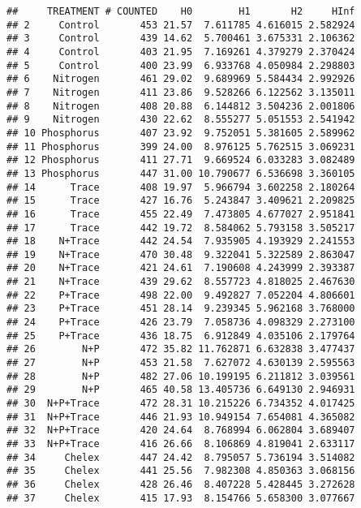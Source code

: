 \documentclass[]{article}
\newenvironment{Shaded}{\begin{snugshade}}{\end{snugshade}}
\newcommand{\KeywordTok}[1]{\textcolor[rgb]{0.13,0.29,0.53}{\textbf{#1}}}
\newcommand{\StringTok}[1]{\textcolor[rgb]{0.31,0.60,0.02}{#1}}
\newcommand{\CommentTok}[1]{\textcolor[rgb]{0.56,0.35,0.01}{\textit{#1}}}
\newcommand{\OperatorTok}[1]{\textcolor[rgb]{0.81,0.36,0.00}{\textbf{#1}}}
\newcommand{\NormalTok}[1]{#1}
\begin{document}
\begin{verbatim}
##     TREATMENT # COUNTED    H0        H1       H2     HInf
## 2     Control       453 21.57  7.611785 4.616015 2.582924
## 3     Control       439 14.62  5.700461 3.675331 2.106362
## 4     Control       403 21.95  7.169261 4.379279 2.370424
## 5     Control       400 23.99  6.933768 4.050984 2.298803
## 6    Nitrogen       461 29.02  9.689969 5.584434 2.992926
## 7    Nitrogen       411 23.86  9.528266 6.122562 3.135011
## 8    Nitrogen       408 20.88  6.144812 3.504236 2.001806
## 9    Nitrogen       430 22.62  8.555277 5.051553 2.541942
## 10 Phosphorus       407 23.92  9.752051 5.381605 2.589962
## 11 Phosphorus       399 24.00  8.976125 5.762515 3.069231
## 12 Phosphorus       411 27.71  9.669524 6.033283 3.082489
## 13 Phosphorus       447 31.00 10.790677 6.536698 3.360105
## 14      Trace       408 19.97  5.966794 3.602258 2.180264
## 15      Trace       427 16.76  5.243847 3.409621 2.209825
## 16      Trace       455 22.49  7.473805 4.677027 2.951841
## 17      Trace       442 19.72  8.584062 5.793158 3.505217
## 18    N+Trace       442 24.54  7.935905 4.193929 2.241553
## 19    N+Trace       470 30.48  9.322041 5.322589 2.863047
## 20    N+Trace       421 24.61  7.190608 4.243999 2.393387
## 21    N+Trace       439 29.62  8.557723 4.818025 2.467630
## 22    P+Trace       498 22.00  9.492827 7.052204 4.806601
## 23    P+Trace       451 28.14  9.239345 5.962168 3.768000
## 24    P+Trace       426 23.79  7.058736 4.098329 2.273100
## 25    P+Trace       436 18.75  6.912849 4.035106 2.179764
## 26        N+P       472 35.82 11.762871 6.632838 3.477437
## 27        N+P       453 21.58  7.627072 4.630139 2.595563
## 28        N+P       482 27.06 10.199195 6.211812 3.039561
## 29        N+P       465 40.58 13.405736 6.649130 2.946931
## 30  N+P+Trace       472 28.31 10.215226 6.734352 4.017425
## 31  N+P+Trace       446 21.93 10.949154 7.654081 4.365082
## 32  N+P+Trace       420 24.64  8.768994 6.062804 3.689407
## 33  N+P+Trace       416 26.66  8.106869 4.819041 2.633117
## 34     Chelex       447 24.42  8.795057 5.736194 3.514082
## 35     Chelex       441 25.56  7.982308 4.850363 3.068156
## 36     Chelex       428 26.46  8.407228 5.428445 3.272628
## 37     Chelex       415 17.93  8.154766 5.658300 3.077667
\end{verbatim}

\begin{Shaded}
\end{Shaded}
\end{document}
